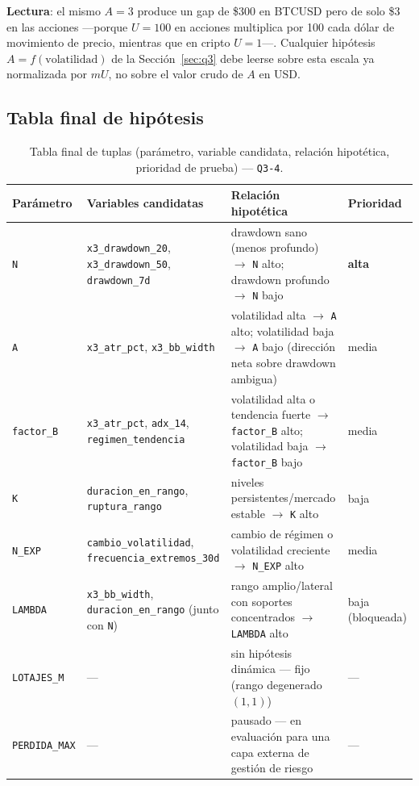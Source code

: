 \documentclass[11pt,a4paper]{article}
\newcommand{\code}[1]{\texttt{\small #1}}
\begin{document}
\textbf{Lectura}: el mismo \(A=3\) produce un gap de \$300 en BTCUSD pero de solo \$3 en
las acciones —porque \(U=100\) en acciones multiplica por 100 cada dólar de movimiento de
precio, mientras que en cripto \(U=1\)—. Cualquier hipótesis \(A=f(\text{volatilidad})\)
de la Sección~\ref{sec:q3} debe leerse sobre esta escala ya normalizada por \(mU\), no
sobre el valor crudo de \(A\) en USD.

\subsection{Tabla final de hipótesis}

\begin{table}[h]
\centering
\small
\begin{tabularx}{\linewidth}{@{}l X X l@{}}
\toprule
\textbf{Parámetro} & \textbf{Variables candidatas} & \textbf{Relación hipotética} &
  \textbf{Prioridad} \\
\midrule
\code{N} & \code{x3\_drawdown\_20}, \code{x3\_drawdown\_50}, \code{drawdown\_7d} &
  drawdown sano (menos profundo) \(\to\) \code{N} alto; drawdown profundo \(\to\)
  \code{N} bajo & \textbf{alta} \\
\code{A} & \code{x3\_atr\_pct}, \code{x3\_bb\_width} &
  volatilidad alta \(\to\) \code{A} alto; volatilidad baja \(\to\) \code{A} bajo
  (dirección neta sobre drawdown ambigua) & media \\
\code{factor\_B} & \code{x3\_atr\_pct}, \code{adx\_14}, \code{regimen\_tendencia} &
  volatilidad alta o tendencia fuerte \(\to\) \code{factor\_B} alto; volatilidad baja
  \(\to\) \code{factor\_B} bajo & media \\
\code{K} & \code{duracion\_en\_rango}, \code{ruptura\_rango} &
  niveles persistentes/mercado estable \(\to\) \code{K} alto & baja \\
\code{N\_EXP} & \code{cambio\_volatilidad}, \code{frecuencia\_extremos\_30d} &
  cambio de régimen o volatilidad creciente \(\to\) \code{N\_EXP} alto & media \\
\code{LAMBDA} & \code{x3\_bb\_width}, \code{duracion\_en\_rango} (junto con \code{N}) &
  rango amplio/lateral con soportes concentrados \(\to\) \code{LAMBDA} alto &
  baja (bloqueada) \\
\code{LOTAJES\_M} & — & sin hipótesis dinámica — fijo (rango degenerado \((1,1)\)) & — \\
\code{PERDIDA\_MAX} & — & pausado — en evaluación para una capa externa de gestión de
  riesgo & — \\
\bottomrule
\end{tabularx}
\caption{Tabla final de tuplas (parámetro, variable candidata, relación hipotética,
prioridad de prueba) — \code{Q3-4}.}
\end{table}
\end{document}
